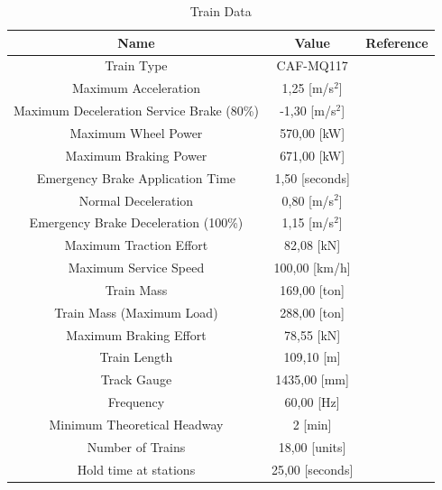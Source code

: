 \documentclass[conference]{IEEEtran}
\begin{document}
\begin{table}[ht]
\caption{Train Data}
\label{table:train_data}
\centering
\begin{tabular}{|c|c|c|}
\hline
\rowcolor[gray]{0.9}
Name & Value & Reference \\ 
\hline
Train Type & CAF-MQ117 & \cite{b10} \\
\hline
Maximum Acceleration & 1,25 [\scriptsize m/s$^2$]  & \cite{b11}  \\
\hline
Maximum Deceleration Service Brake \scriptsize(80\%)  & -1,30 [\scriptsize m/s$^2$] & \cite{b11} \\
\hline
Maximum Wheel Power  & 570,00 [\scriptsize kW] & \cite{b12} \\
\hline
Maximum Braking Power  & 671,00 [\scriptsize kW] & \cite{b12} \\
\hline
Emergency Brake Application Time  & 1,50 [\scriptsize seconds] & \cite{b11} \\
\hline
Normal Deceleration & 0,80 [\scriptsize m/s$^2$]  & \cite{b11} \\
\hline
Emergency Brake Deceleration \scriptsize(100\%) & 1,15 [\scriptsize m/s$^2$]  & \cite{b11} \\
\hline
Maximum Traction Effort  & 82,08 [\scriptsize kN] & \cite{b12} \\
\hline
Maximum Service Speed & 100,00 [\scriptsize km/h] & \cite{b11} \\
\hline
Train Mass & 169,00 [\scriptsize ton]& \cite{b11} \\
\hline
Train Mass (Maximum Load) & 288,00 [\scriptsize ton] & \cite{b11} \\
\hline
Maximum Braking Effort & 78,55 [\scriptsize kN] & \cite{b12} \\
\hline
Train Length & 109,10 [\scriptsize m] & \cite{b11} \\
\hline
Track Gauge & 1435,00 \scriptsize[mm] & \cite{b11} \\
\hline
Frequency  & 60,00 \scriptsize[Hz] & \cite{b13} \\
\hline
Minimum Theoretical Headway  & 2 [\scriptsize min]& \cite{b14} \\
\hline
Number of Trains  & 18,00 [\scriptsize units] & \cite{b14} \\
\hline
Hold time at stations & 25,00 [\scriptsize seconds] & \cite{b15} \\
\hline
\end{tabular}
\end{table}
\end{document}
